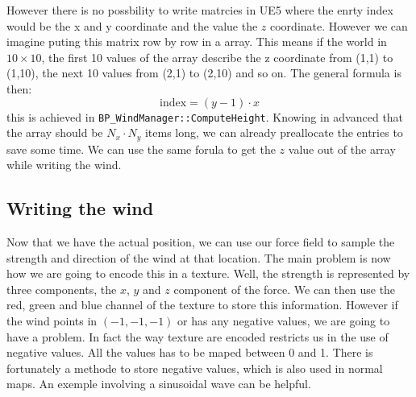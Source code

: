 \documentclass[../main.tex]{subfile}
\begin{document}
However there is no possbility to write matrcies in UE5 where the enrty index would be the x and y coordinate and the value the $z$ coordinate. However
we can imagine puting this matrix row by row in a array. This means if the world in $10\times10$, the first 10 values of the array describe the z coordinate from 
(1,1) to (1,10), the next 10 values from (2,1) to (2,10) and so on. The general formula is then:
\[
    \text{index} =(y-1)\cdot x
\]
this is achieved in \texttt{BP\_WindManager::ComputeHeight}. Knowing in advanced that the array should be $N_x \cdot N_y$ items long, 
we can already preallocate the entries to save some time. We can use the same forula to get the $z$ value out of the array while writing the wind.\\

\subsection{Writing the wind}
Now that we have the actual position, we can use our force field to sample the strength and direction of the wind at that location. The main problem is now how we
are going to encode this in a texture. Well, the strength is represented by three components, the $x$, $y$ and $z$ component of the force. We can then use the red, green and blue
channel of the texture to store this information. However if the wind points in $(-1,-1,-1)$ or has any negative values, we are going to have a problem. In fact the 
way texture are encoded restricts us in the use of negative values. All the values has to be maped between 0 and 1. There is fortunately a methode to store negative values, which is also used in normal maps. An
exemple involving a sinusoidal wave can be helpful.\\
\end{document}
